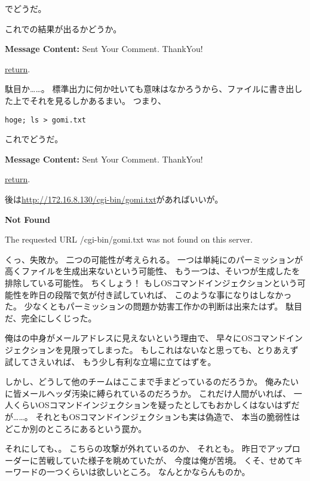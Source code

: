 でどうだ。

これでの結果が出るかどうか。

\begin{itembox}[c]{\textbf{Message Content:}}
Sent Your Comment. ThankYou!

\underline{return}. 
\end{itembox}

駄目か……。
標準出力に何か吐いても意味はなかろうから、ファイルに書き出した上でそれを見るしかあるまい。
つまり、

\begin{lstlisting}
hoge; ls > gomi.txt
\end{lstlisting}

これでどうだ。

\begin{itembox}[c]{\textbf{Message Content:}}
Sent Your Comment. ThankYou!

\underline{return}. 
\end{itembox}

後は\url{http://172.16.8.130/cgi-bin/gomi.txt}があればいいが。

\begin{itembox}[c]{\textbf{Not Found}}

The requested URL /cgi-bin/gomi.txt was not found on this server.
\end{itembox}

くっ、失敗か。
二つの可能性が考えられる。
一つは単純にのパーミッションが高くファイルを生成出来ないという可能性、
もう一つは、そいつが生成したを排除している可能性。
ちくしょう！
もしOSコマンドインジェクションという可能性を昨日の段階で気が付き試していれば、
このような事になりはしなかった。
少なくともパーミッションの問題か妨害工作かの判断は出来たはず。
駄目だ、完全にしくじった。

俺はの中身がメールアドレスに見えないという理由で、
早々にOSコマンドインジェクションを見限ってしまった。
もしこれはないなと思っても、とりあえず試してさえいれば、
もう少し有利な立場に立てはずを。

しかし、どうして他のチームはここまで手まどっているのだろうか。
俺みたいに皆メールヘッダ汚染に縛られているのだろうか。
これだけ人間がいれば、
一人くらいOSコマンドインジェクションを疑ったとしてもおかしくはないはずだが……。
それともOSコマンドインジェクションも実は偽造で、
本当の脆弱性はどこか別のところにあるという罠か。

それにしても、。
こちらの攻撃が外れているのか、
それとも。
昨日でアップローダーに苦戦していた様子を眺めていたが、
今度は俺が苦境。
くそ、せめてキーワードの一つくらいは欲しいところ。
なんとかならんものか。

